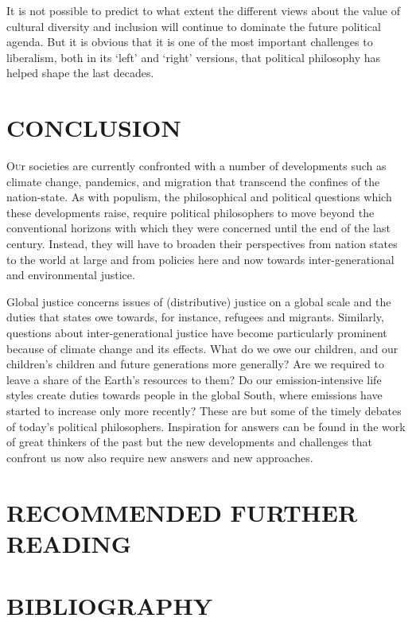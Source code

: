 \documentclass[11pt]{article}
\begin{document}
It is not possible to predict to what extent the different views about the value of cultural diversity and inclusion will continue to dominate the future political agenda. But it is obvious that it is one of the most important challenges to liberalism, both in its ‘left’ and ‘right’ versions, that political philosophy has helped shape the last decades.


\section{CONCLUSION}
\lettrine[lines=3]{O}ur societies are currently confronted with a number of developments such as climate change, pandemics, and migration that transcend the confines of the nation-state. As with populism, the philosophical and political questions which these developments raise, require political philosophers to move beyond the conventional horizons with which they were concerned until the end of the last century. Instead, they will have to broaden their perspectives from nation states to the world at large and from policies here and now towards inter-generational and environmental justice.

Global justice concerns issues of (distributive) justice on a global scale and the duties that states owe towards, for instance, refugees and migrants. Similarly,
questions about inter-generational justice have become particularly prominent because of climate change and its effects. What do we owe our children, and our children’s children and future generations more generally? Are we required to leave a share of the Earth’s resources to them? Do our emission-intensive life styles create duties towards people in the global South, where emissions have started to increase only more recently? These are but some of the timely debates of today’s political philosophers. Inspiration for answers can be found in the work of great thinkers of the past but the new developments and challenges that confront us now also require new answers and new approaches.

\clearpage
{}
\section*{RECOMMENDED FURTHER READING}



\section*{BIBLIOGRAPHY}
\nocite{*}
\printbibliography[heading=none]
\end{document}
